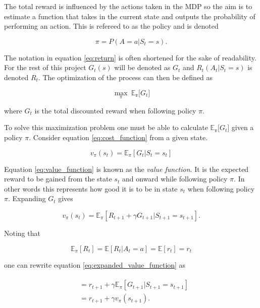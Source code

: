 The total reward is influenced by the actions taken in the MDP so the aim is to estimate a function that takes in the current state and outputs the probability of performing an action. This is refereed to as the policy and is denoted

\begin{equation}
    \pi = P(A=a|S_t=s).
\end{equation}

The notation in equation \ref{eq:return} is often shortened for the sake of readability. For the rest of this project $G_t(s)$ will be denoted as $G_t$ and $R_t(A_t|S_t=s)$ is denoted $R_t$. The optimization of the process can then be defined as 

\begin{equation}
    \max_\pi ~ \mathbb{E_\pi}\big[G_t]
    \label{eq:cost_function}
\end{equation}

where $G_t$ is the total discounted reward when following policy $\pi$.

To solve this maximization problem one must be able to calculate $\mathbb{E_\pi}\big[G_t]$ given a policy $\pi$. Consider equation \ref{eq:cost_function} from a given state. 

\begin{equation}
    v_\pi(s_t) = \mathbb{E}_\pi[G_t|S_t=s_t]
    \label{eq:value_function}
\end{equation}

Equation \ref{eq:value_function} is known as the \textit{value function}. It is the expected reward to be gained from the state $s_t$ and onward while following policy $\pi$. In other words this represents how good it is to be in state $s_t$ when following policy $\pi$. Expanding $G_t$ gives

\begin{equation}
    v_\pi(s_t)  = \mathbb{E}_\pi[R_{t+1} + \gamma G_{t+1}|S_{t+1}=s_{t+1}].
    \label{eq:expanded_value_function}
\end{equation}

Noting that 

\begin{equation}
    \mathbb{E}_\pi[R_t] = \mathbb{E}[R_t|A_t=a] = \mathbb{E}[r_t] = r_t
\end{equation}

one can rewrite equation \ref{eq:expanded_value_function} as 

\begin{align}
\begin{split}
    &=  r_{t+1} + \gamma\mathbb{E}_\pi[G_{t+1}|S_{t+1}=s_{t+1}] \\
    &= r_{t+1} + \gamma v_\pi(s_{t+1}).
    \label{eq:bellman_value_function}
\end{split}
\end{align}

